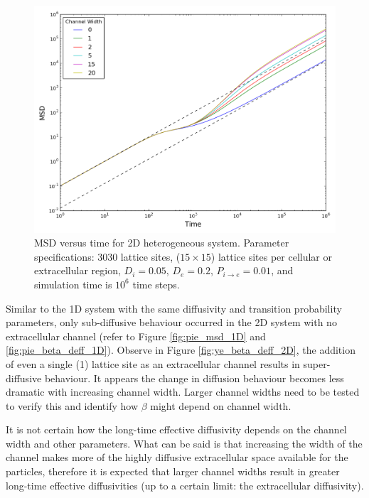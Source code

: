 	\begin{figure}[h]
		\centering
		\includegraphics[width=1.0\linewidth]{../images/2D/ye_msd_2D}
		\caption{MSD versus time for 2D heterogeneous system. Parameter specifications: 3030 lattice sites, ($ 15 \times 15 $) lattice sites per cellular or extracellular region, $ D_i = 0.05 $, $ D_e = 0.2 $, $ P_{i \rightarrow e} = 0.01 $, and simulation time is $ 10^6 $ time steps.}
		\label{fig:ye_msd_2D}
	\end{figure}
	
	Similar to the 1D system with the same diffusivity and transition probability parameters, only sub-diffusive behaviour occurred in the 2D system with no extracellular channel (refer to Figure \ref{fig:pie_msd_1D} and \ref{fig:pie_beta_deff_1D}). Observe in Figure \ref{fig:ye_beta_deff_2D}, the addition of even a single (1) lattice site as an extracellular channel results in super-diffusive behaviour. It appears the change in diffusion behaviour becomes less dramatic with increasing channel width. Larger channel widths need to be tested to verify this and identify how $ \beta $ might depend on channel width.
	
	It is not certain how the long-time effective diffusivity depends on the channel width and other parameters. What can be said is that increasing the width of the channel makes more of the highly diffusive extracellular space available for the particles, therefore it is expected that larger channel widths result in greater long-time effective diffusivities (up to a certain limit: the extracellular diffusivity).
	
